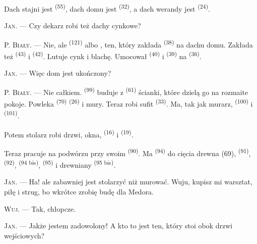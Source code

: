 Dach stajni jest  \textsuperscript{(55)}, dach domu jest
 \textsuperscript{(32)}, a dach werandy jest 
\textsuperscript{(24)}.

\textsc{Jan}. --- Czy dekarz robi też dachy cynkowe?

P. \textsc{Biały}. --- Nie, ale  \textsuperscript{(121)} albo
, ten, który zakłada  \textsuperscript{(38)} na dachu
domu. Zakłada też  \textsuperscript{(43)} i 
\textsuperscript{(42)}. Lutuje cynk i blachę. Umocował 
\textsuperscript{(40)} i  \textsuperscript{(39)} na
 \textsuperscript{(36)}.

\textsc{Jan}. --- Więc dom jest ukończony?

\VUsaut{3.0mm}
\VUsaut{3.0mm}

P. \textsc{Biały}. --- Nie całkiem.  \textsuperscript{(99)} buduje z
 \textsuperscript{(61)} ścianki, które dzielą go na rozmaite pokoje.
Powleka  \textsuperscript{(70)}  \textsuperscript{(26)} i
mury. Teraz robi sufit  \textsuperscript{(33)}. Ma, tak jak murarz,
 \textsuperscript{(100)} i  \textsuperscript{(101)}.

Potem stolarz robi drzwi, okna,  \textsuperscript{(16)} i
 \textsuperscript{(19)}.

Teraz pracuje na podwórzu przy swoim  \textsuperscript{(90)}. Ma
 \textsuperscript{(94)} do cięcia drewna (69), 
\textsuperscript{(91)},  \textsuperscript{(92)}, 
\textsuperscript{(94 bis)},  \textsuperscript{(95)} i drewniany
 \textsuperscript{(95 bis)}.

\textsc{Jan}. --- Ha! ale zabawniej jest stolarzyć niż murować. Wuju, kupisz mi
warsztat, piłę i strug, bo wkrótce zrobię budę dla Medora.

\textsc{Wuj}. --- Tak, chłopcze.

\textsc{Jan}. --- Jakże jestem zadowolony! A kto to jest ten, który stoi obok drzwi
wejściowych?

\VUsaut{3.0mm}
\VUsaut{3.0mm}


